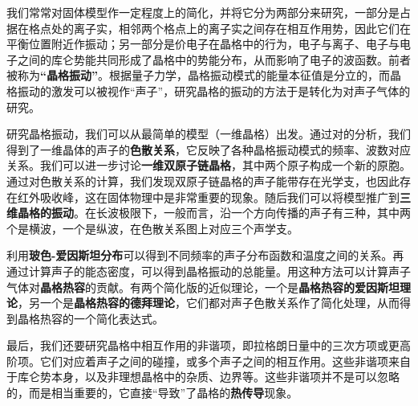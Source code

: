 
我们常常对固体模型作一定程度上的简化，并将它分为两部分来研究，一部分是占据在格点处的离子实，相邻两个格点上的离子实之间存在相互作用势，因此它们在平衡位置附近作振动；另一部分是价电子在晶格中的行为，电子与离子、电子与电子之间的库仑势能共同形成了晶格中的势能分布，从而影响了电子的波函数。前者被称为\textbf{“晶格振动”}。根据量子力学，晶格振动模式的能量本征值是分立的，而晶格振动的激发可以被视作“声子”，研究晶格的振动的方法于是转化为对声子气体的研究。

研究晶格振动，我们可以从最简单的模型（一维晶格）出发。通过对的分析，我们得到了一维晶体的声子的\textbf{色散关系}，它反映了各种晶格振动模式的频率、波数对应关系。我们可以进一步讨论\textbf{一维双原子链晶格}，其中两个原子构成一个新的原胞。通过对色散关系的计算，我们发现双原子链晶格的声子能带存在光学支，也因此存在红外吸收峰，这在固体物理中是非常重要的现象。随后我们可以将模型推广到\textbf{三维晶格的振动}。在长波极限下，一般而言，沿一个方向传播的声子有三种，其中两个是横波，一个是纵波，在色散关系图上对应三个声学支。

利用\textbf{玻色-爱因斯坦分布}可以得到不同频率的声子分布函数和温度之间的关系。再通过计算声子的能态密度，可以得到晶格振动的总能量。用这种方法可以计算声子气体对\textbf{晶格热容}的贡献。有两个简化版的近似理论，一个是\textbf{晶格热容的爱因斯坦理论}，另一个是\textbf{晶格热容的德拜理论}，它们都对声子色散关系作了简化处理，从而得到晶格热容的一个简化表达式。

最后，我们还要研究晶格中相互作用的非谐项，即拉格朗日量中的三次方项或更高阶项。它们对应着声子之间的碰撞，或多个声子之间的相互作用。这些非谐项来自于库仑势本身，以及非理想晶格中的杂质、边界等。这些非谐项并不是可以忽略的，而是相当重要的，它直接“导致”了晶格的\textbf{热传导}现象。
